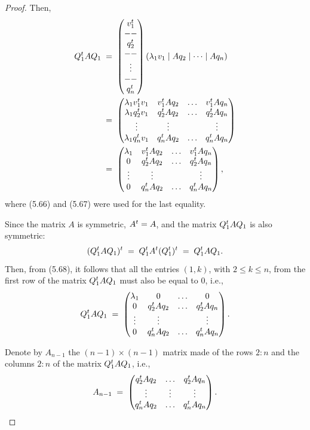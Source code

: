 \begin{proof}
Then,
\begin{equation}
\begin{split}
Q_1^{t} AQ_1 \;&=\;
\begin{pmatrix} v_1^{t}\\ --\\ q_2^{t}\\ --\\ \vdots\\ --\\ q_n^{t} \end{pmatrix}
(\lambda_1v_1 \mid Aq_2 \mid \dots \mid Aq_n)\\
&=\;
\begin{pmatrix}
\lambda_1v_1^{t} v_1 & v_1^{t} Aq_2 & \dots & v_1^{t} Aq_n\\
\lambda_1q_2^{t} v_1 & q_2^{t} Aq_2 & \dots & q_2^{t} Aq_n\\
\vdots & \vdots & & \vdots\\
\lambda_1q_n^{t} v_1 & q_n^{t} Aq_2 & \dots & q_n^{t} Aq_n
\end{pmatrix}\\
&=\;
\begin{pmatrix}
\lambda_1 & v_1^{t} Aq_2 & \dots & v_1^{t} Aq_n\\
0 & q_2^{t} Aq_2 & \dots & q_2^{t} Aq_n\\
\vdots & \vdots & & \vdots\\
0 & q_n^{t} Aq_2 & \dots & q_n^{t} Aq_n
\end{pmatrix},
\end{split}
\end{equation}
where (5.66) and (5.67) were used for the last equality.

Since the matrix $A$ is symmetric, $A^{t} = A$, and the matrix $Q_1^{t} AQ_1$ is also
symmetric:
\begin{equation}
(Q_1^{t} AQ_1)^{t} \;=\; Q_1^{t} A^{t} (Q_1^{t})^{t} \;=\; Q_1^{t} AQ_1.
\end{equation}
Then, from (5.68), it follows that all the entries $(1,k)$, with $2 \leq k \leq n$,
from the first row of the matrix $Q_1^{t} AQ_1$ must also be equal to 0, i.e.,
\[
Q_1^{t} AQ_1 \;=\;
\begin{pmatrix}
\lambda_1 & 0 & \dots & 0\\
0 & q_2^{t} Aq_2 & \dots & q_2^{t} Aq_n\\
\vdots & \vdots & & \vdots\\
0 & q_n^{t} Aq_2 & \dots & q_n^{t} Aq_n
\end{pmatrix}.
\]

Denote by $A_{n-1}$ the $(n-1) \times (n-1)$ matrix made of the rows $2:n$ and the
columns $2:n$ of the matrix $Q_1^{t} AQ_1$, i.e.,
\[
A_{n-1} \;=\;
\begin{pmatrix}
q_2^{t} Aq_2 & \dots & q_2^{t} Aq_n\\
\vdots & \vdots & \vdots\\
q_n^{t} Aq_2 & \dots & q_n^{t} Aq_n
\end{pmatrix}.
\]


\end{proof}
